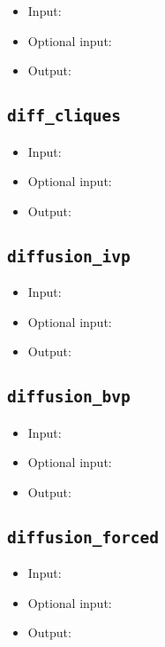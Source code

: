 \documentclass[10pt]{article}
\theoremstyle{definition}
\numberwithin{theorem}{section}
\numberwithin{definition}{section}
\numberwithin{lemma}{section}
\numberwithin{corollary}{section}
\numberwithin{clm}{section}
\numberwithin{rmk}{section}
\begin{document}
\begin{itemize}
	\item Input: 
	\item Optional input:
	\item Output: 
\end{itemize}

\cprotect \subsection{\verb|diff_cliques|}

\begin{itemize}
	\item Input: 
	\item Optional input:
	\item Output: 
\end{itemize}

\cprotect \subsection{\verb|diffusion_ivp|}

\begin{itemize}
	\item Input: 
	\item Optional input:
	\item Output: 
\end{itemize}

\cprotect \subsection{\verb|diffusion_bvp|}

\begin{itemize}
	\item Input: 
	\item Optional input:
	\item Output: 
\end{itemize}

\cprotect \subsection{\verb|diffusion_forced|}

\begin{itemize}
	\item Input: 
	\item Optional input:
	\item Output: 
\end{itemize}
\end{document}
